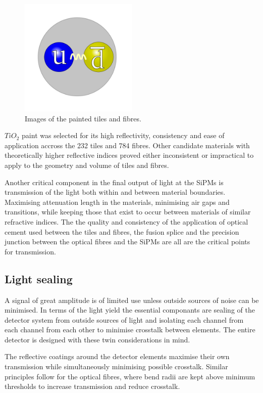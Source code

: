 \begin{figure}
	\centering
	\includegraphics[width=0.5\textwidth]{ImgChap1/meson2}
	\caption{Images of the painted tiles and fibres.}
	\label{PaintedTilesandFibres}
\end{figure}


$TiO_{2}$ paint was selected for its high reflectivity, consistency and ease of application accross the 232 tiles and 784 fibres. Other candidate materials with theoretically higher reflective indices proved either inconsistent or impractical to apply to the geometry and volume of tiles and fibres.

Another critical component in the final output of light at the SiPMs is transmission of the light both within and between material boundaries. Maximising attenuation length in the materials, minimising air gaps and transitions, while keeping those that exist to occur between materials of similar refractive indices. The the quality and consistency of the application of optical cement used between the tiles and fibres, the fusion splice and the precision junction between the optical fibres and the SiPMs are all are the critical points for transmission.

\subsection{Light sealing}

A signal of great amplitude is of limited use unless outside sources of noise can be minimised. In terms of the light yield the essential componants are sealing of the detector system from outside sources of light and isolating each channel from each channel from each other to minimise crosstalk between elements. The entire detector is designed with these twin considerations in mind. 

The reflective coatings around the detector elements maximise their own transmission while simultaneously minimising possible crosstalk. Similar principles follow for the optical fibres, where bend radii are kept above minimum thresholds to increase transmission and reduce crosstalk. 

